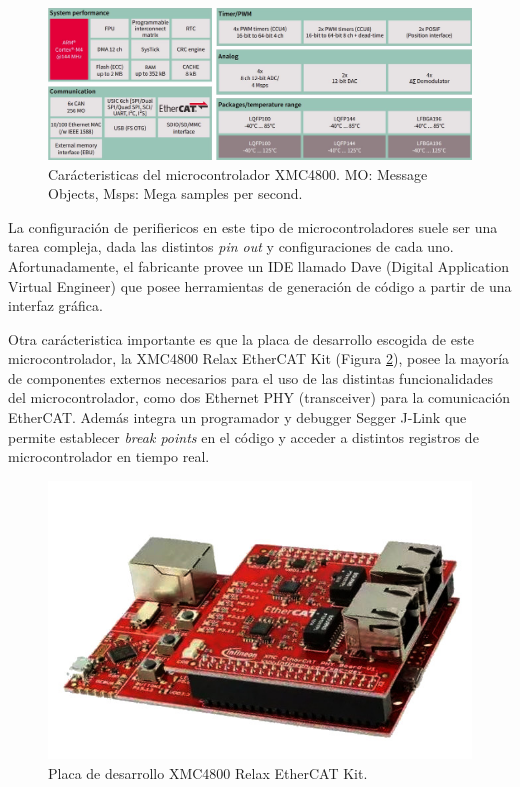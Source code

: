 \begin{figure}[ht]
  \centering
  \includegraphics[scale=.2]{img/cap3/xmc4800_data}
  \caption{Carácteristicas del microcontrolador XMC4800. MO: Message Objects, Msps: Mega samples per second.}
  \label{cap3_xmc4800_data}
\end{figure}

La configuración de perifiericos en este tipo de microcontroladores suele ser una tarea compleja, dada las distintos \textit{pin out} y configuraciones de cada uno. Afortunadamente, el fabricante provee un IDE llamado Dave (Digital Application Virtual Engineer) que posee herramientas de generación de código a partir de una interfaz gráfica.

Otra carácteristica importante es que la placa de desarrollo escogida de este microcontrolador, la XMC4800 Relax EtherCAT Kit (Figura \ref{cap3_xmc4800}), posee la mayoría de componentes externos necesarios para el uso de las distintas funcionalidades del microcontrolador, como dos Ethernet PHY (transceiver) para la comunicación EtherCAT. Además integra un programador y debugger Segger J-Link que permite establecer \textit{break points} en el código y acceder a distintos registros de microcontrolador en tiempo real.

\begin{figure}[ht]
  \centering
  \includegraphics[scale=.4]{img/cap3/xmc4800}
  \caption{Placa de desarrollo XMC4800 Relax EtherCAT Kit.}
  \label{cap3_xmc4800}
\end{figure}
 

